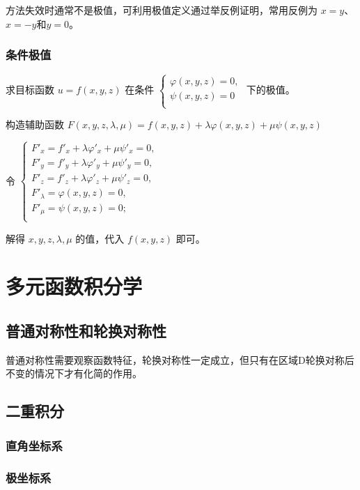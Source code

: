 ﻿\documentclass[a4paper,12pt,UTF8]{ctexart}
\begin{document}
    方法失效时通常不是极值，可利用极值定义通过举反例证明，常用反例为 \(x=y\)、\(x=-y\)和\(y=0\)。

    \subsubsection{条件极值}
    求目标函数 \(u=f(x,y,z)\) 在条件 
        \(\begin{cases}
            \varphi (x,y,z)=0,\\
            \psi (x,y,z)=0\\
        \end{cases}\) 
    下的极值。
        
    构造辅助函数 \(F(x,y,z,\lambda,\mu)=f(x,y,z)+\lambda \varphi (x,y,z)+\mu \psi (x,y,z)\)

    令
    \(\begin{cases}
        F'_x=f'_x+\lambda \varphi '_x + \mu \psi '_x=0,\\
        F'_y=f'_y+\lambda \varphi '_y + \mu \psi '_y=0,\\
        F'_z=f'_z+\lambda \varphi '_z + \mu \psi '_z=0,\\
        F'_\lambda=\varphi (x,y,z)=0,\\
        F'_\mu=\psi (x,y,z)=0;\\
    \end{cases} \)

    解得 \(x,y,z,\lambda,\mu\) 的值，代入 \(f(x,y,z)\) 即可。
     
    \section{多元函数积分学}

    \subsection{普通对称性和轮换对称性}
    普通对称性需要观察函数特征，轮换对称性一定成立，但只有在区域D轮换对称后不变的情况下才有化简的作用。

    \subsection{二重积分}

    \subsubsection{直角坐标系}

    \subsubsection{极坐标系}
\end{document}

